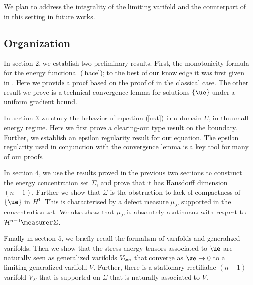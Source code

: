 We plan to address the integrality of the limiting varifold and the counterpart of \cite{tw} in this setting in future works.


\subsection{Organization} 
  
  In section $2$, we establish two preliminary results. First, the monotonicity formula for the energy functional (\ref{hace}); to the best of our knowledge it was first given in \cite{ms}. Here we provide a proof based on the proof of \cite{ht} in the classical case. The other result we prove is a technical convergence lemma for solutions $\{ \ue \}$ under a uniform gradient bound.

  In section $3$ we study the behavior of equation (\ref{ext}) in a domain $U$, in the small energy regime. Here we first prove a clearing-out type result on the boundary. Further, we establish an epsilon regularity result for our equation. The epsilon regularity used in conjunction with the convergence lemma is a key tool for many of our proofs. 

  In section $4$, we use the results proved in the previous two sections to construct the energy concentration set $\Sigma$, and prove that it has Hausdorff dimension  $(n-1)$. Further we show that $\Sigma$ is the obstruction to lack of compactness of $\{ \ue\}$ in $H^1$. This is characterised by a defect measure $\mu_{\Sigma}$ supported in the concentration set. We also show that $\mu_{\Sigma}$ is absolutely continuous with respect to $\mathcal{H}^{n-1}\measurer \Sigma$.

  Finally in section $5$, we briefly recall the formalism of varifolds and generalized varifolds. Then we show that the stress-energy tensors associated to $\ue$ are naturally seen as generalized varifolds $V_{\ve}$ that converge as $\ve \to 0$ to a limiting generalized varifold $V$. Further, there is a stationary rectifiable $(n-1)$-varifold $V_{\Sigma}$ that is supported on $\Sigma$ that is naturally associated to $V$. 
  

